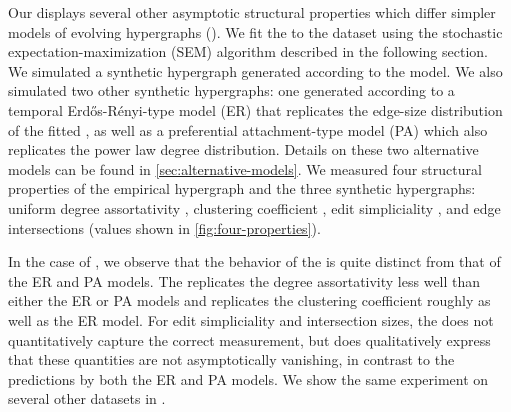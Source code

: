 Our \model displays several other asymptotic structural properties which differ simpler models of evolving hypergraphs (). 
We fit the \model to the  dataset using the stochastic expectation-maximization (SEM) algorithm described in the following section. 
We simulated a synthetic hypergraph generated according to the model. 
We also simulated two other synthetic hypergraphs: one generated according to a temporal Erd\H{o}s-R\'enyi-type model (ER) that replicates the edge-size distribution of the fitted \model, as well as a preferential attachment-type model (PA) which also replicates the power law degree distribution.
Details on these two alternative models can be found in \cref{sec:alternative-models}.  
We measured four structural properties of the empirical  hypergraph and the three synthetic hypergraphs: uniform degree assortativity \cite{chodrowConfigurationModelsRandom2020}, clustering coefficient \cite{gallagherClusteringCoefficientsProtein2013}, edit simpliciality \cite{landrySimplicialityHigherorderNetworks2024}, and edge intersections \cite{landrySimplicialityHigherorderNetworks2024} (values shown in \autoref{fig:four-properties}). 

In the case of , we observe that the behavior of the \model is quite distinct from that of the ER and PA models. 
The \model replicates the degree assortativity less well than either the ER or PA models and replicates the clustering coefficient roughly as well as the ER model. 
For edit simpliciality and intersection sizes, the \model does not quantitatively capture the correct measurement, but does qualitatively express that these quantities are not asymptotically vanishing, in contrast to the predictions by both the ER and PA models. 
We show the same experiment on several other datasets in  . 




